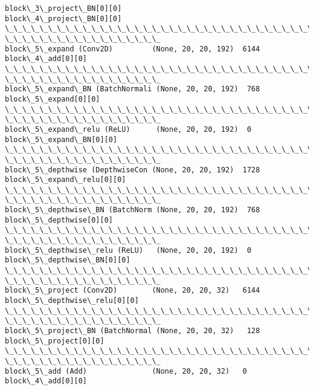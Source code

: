 \documentclass[11pt]{article}
\begin{document}
\begin{Verbatim}[commandchars=\\\{\}]
block\_3\_project\_BN[0][0]
block\_4\_project\_BN[0][0]
\_\_\_\_\_\_\_\_\_\_\_\_\_\_\_\_\_\_\_\_\_\_\_\_\_\_\_\_\_\_\_\_\_\_\_\_\_\_\_\_\_\_\_\_\_\_\_\_\_\_\_\_\_\_\_\_\_\_\_\_\_\_\_\_\_\_\_\_\_\_\_\_\_\_\_\_\_\_\_\_
\_\_\_\_\_\_\_\_\_\_\_\_\_\_\_\_\_\_
block\_5\_expand (Conv2D)         (None, 20, 20, 192)  6144
block\_4\_add[0][0]
\_\_\_\_\_\_\_\_\_\_\_\_\_\_\_\_\_\_\_\_\_\_\_\_\_\_\_\_\_\_\_\_\_\_\_\_\_\_\_\_\_\_\_\_\_\_\_\_\_\_\_\_\_\_\_\_\_\_\_\_\_\_\_\_\_\_\_\_\_\_\_\_\_\_\_\_\_\_\_\_
\_\_\_\_\_\_\_\_\_\_\_\_\_\_\_\_\_\_
block\_5\_expand\_BN (BatchNormali (None, 20, 20, 192)  768
block\_5\_expand[0][0]
\_\_\_\_\_\_\_\_\_\_\_\_\_\_\_\_\_\_\_\_\_\_\_\_\_\_\_\_\_\_\_\_\_\_\_\_\_\_\_\_\_\_\_\_\_\_\_\_\_\_\_\_\_\_\_\_\_\_\_\_\_\_\_\_\_\_\_\_\_\_\_\_\_\_\_\_\_\_\_\_
\_\_\_\_\_\_\_\_\_\_\_\_\_\_\_\_\_\_
block\_5\_expand\_relu (ReLU)      (None, 20, 20, 192)  0
block\_5\_expand\_BN[0][0]
\_\_\_\_\_\_\_\_\_\_\_\_\_\_\_\_\_\_\_\_\_\_\_\_\_\_\_\_\_\_\_\_\_\_\_\_\_\_\_\_\_\_\_\_\_\_\_\_\_\_\_\_\_\_\_\_\_\_\_\_\_\_\_\_\_\_\_\_\_\_\_\_\_\_\_\_\_\_\_\_
\_\_\_\_\_\_\_\_\_\_\_\_\_\_\_\_\_\_
block\_5\_depthwise (DepthwiseCon (None, 20, 20, 192)  1728
block\_5\_expand\_relu[0][0]
\_\_\_\_\_\_\_\_\_\_\_\_\_\_\_\_\_\_\_\_\_\_\_\_\_\_\_\_\_\_\_\_\_\_\_\_\_\_\_\_\_\_\_\_\_\_\_\_\_\_\_\_\_\_\_\_\_\_\_\_\_\_\_\_\_\_\_\_\_\_\_\_\_\_\_\_\_\_\_\_
\_\_\_\_\_\_\_\_\_\_\_\_\_\_\_\_\_\_
block\_5\_depthwise\_BN (BatchNorm (None, 20, 20, 192)  768
block\_5\_depthwise[0][0]
\_\_\_\_\_\_\_\_\_\_\_\_\_\_\_\_\_\_\_\_\_\_\_\_\_\_\_\_\_\_\_\_\_\_\_\_\_\_\_\_\_\_\_\_\_\_\_\_\_\_\_\_\_\_\_\_\_\_\_\_\_\_\_\_\_\_\_\_\_\_\_\_\_\_\_\_\_\_\_\_
\_\_\_\_\_\_\_\_\_\_\_\_\_\_\_\_\_\_
block\_5\_depthwise\_relu (ReLU)   (None, 20, 20, 192)  0
block\_5\_depthwise\_BN[0][0]
\_\_\_\_\_\_\_\_\_\_\_\_\_\_\_\_\_\_\_\_\_\_\_\_\_\_\_\_\_\_\_\_\_\_\_\_\_\_\_\_\_\_\_\_\_\_\_\_\_\_\_\_\_\_\_\_\_\_\_\_\_\_\_\_\_\_\_\_\_\_\_\_\_\_\_\_\_\_\_\_
\_\_\_\_\_\_\_\_\_\_\_\_\_\_\_\_\_\_
block\_5\_project (Conv2D)        (None, 20, 20, 32)   6144
block\_5\_depthwise\_relu[0][0]
\_\_\_\_\_\_\_\_\_\_\_\_\_\_\_\_\_\_\_\_\_\_\_\_\_\_\_\_\_\_\_\_\_\_\_\_\_\_\_\_\_\_\_\_\_\_\_\_\_\_\_\_\_\_\_\_\_\_\_\_\_\_\_\_\_\_\_\_\_\_\_\_\_\_\_\_\_\_\_\_
\_\_\_\_\_\_\_\_\_\_\_\_\_\_\_\_\_\_
block\_5\_project\_BN (BatchNormal (None, 20, 20, 32)   128
block\_5\_project[0][0]
\_\_\_\_\_\_\_\_\_\_\_\_\_\_\_\_\_\_\_\_\_\_\_\_\_\_\_\_\_\_\_\_\_\_\_\_\_\_\_\_\_\_\_\_\_\_\_\_\_\_\_\_\_\_\_\_\_\_\_\_\_\_\_\_\_\_\_\_\_\_\_\_\_\_\_\_\_\_\_\_
\_\_\_\_\_\_\_\_\_\_\_\_\_\_\_\_\_\_
block\_5\_add (Add)               (None, 20, 20, 32)   0
block\_4\_add[0][0]

\end{Verbatim}
\end{document}

